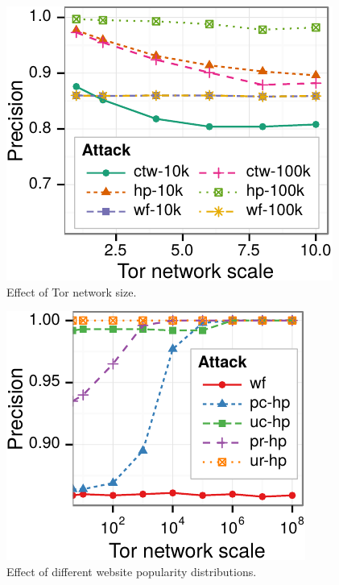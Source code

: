\begin{figure}[t]
\centering    \includegraphics[width=0.95\linewidth]{figures/fpt/scale/1kx100+100k-ggplot2}
\caption{Effect of Tor network size.}
    \label{fig:fpt:var:scale}
\end{figure}


\begin{figure}[t]
\centering    \includegraphics[width=0.95\linewidth]{figures/fpt/dist/1kx100+100k-ggplot2}
\caption{Effect of different website popularity distributions.}   \label{fig:fpt:var:dist}
\end{figure}


